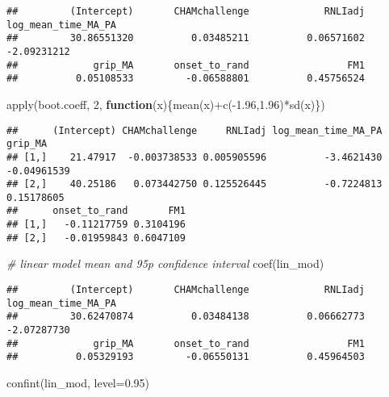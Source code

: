 \documentclass[
]{article}
\newenvironment{Shaded}{\begin{snugshade}}{\end{snugshade}}
\newcommand{\AttributeTok}[1]{\textcolor[rgb]{0.77,0.63,0.00}{#1}}
\newcommand{\CommentTok}[1]{\textcolor[rgb]{0.56,0.35,0.01}{\textit{#1}}}
\newcommand{\ControlFlowTok}[1]{\textcolor[rgb]{0.13,0.29,0.53}{\textbf{#1}}}
\newcommand{\DecValTok}[1]{\textcolor[rgb]{0.00,0.00,0.81}{#1}}
\newcommand{\FloatTok}[1]{\textcolor[rgb]{0.00,0.00,0.81}{#1}}
\newcommand{\FunctionTok}[1]{\textcolor[rgb]{0.00,0.00,0.00}{#1}}
\newcommand{\NormalTok}[1]{#1}
\newcommand{\SpecialCharTok}[1]{\textcolor[rgb]{0.00,0.00,0.00}{#1}}
\begin{document}
\begin{verbatim}
##         (Intercept)       CHAMchallenge             RNLIadj log_mean_time_MA_PA 
##         30.86551320          0.03485211          0.06571602         -2.09231212 
##             grip_MA       onset_to_rand                 FM1 
##          0.05108533         -0.06588801          0.45756524
\end{verbatim}

\begin{Shaded}
\begin{Highlighting}[]
\FunctionTok{apply}\NormalTok{(boot.coeff, }\DecValTok{2}\NormalTok{, }\ControlFlowTok{function}\NormalTok{(x)\{}\FunctionTok{mean}\NormalTok{(x)}\SpecialCharTok{+}\FunctionTok{c}\NormalTok{(}\SpecialCharTok{{-}}\FloatTok{1.96}\NormalTok{,}\FloatTok{1.96}\NormalTok{)}\SpecialCharTok{*}\FunctionTok{sd}\NormalTok{(x)\})}
\end{Highlighting}
\end{Shaded}

\begin{verbatim}
##      (Intercept) CHAMchallenge     RNLIadj log_mean_time_MA_PA     grip_MA
## [1,]    21.47917  -0.003738533 0.005905596          -3.4621430 -0.04961539
## [2,]    40.25186   0.073442750 0.125526445          -0.7224813  0.15178605
##      onset_to_rand       FM1
## [1,]   -0.11217759 0.3104196
## [2,]   -0.01959843 0.6047109
\end{verbatim}

\begin{Shaded}
\begin{Highlighting}[]
\CommentTok{\# linear model mean and 95p confidence interval}
\FunctionTok{coef}\NormalTok{(lin\_mod)}
\end{Highlighting}
\end{Shaded}

\begin{verbatim}
##         (Intercept)       CHAMchallenge             RNLIadj log_mean_time_MA_PA 
##         30.62470874          0.03484138          0.06662773         -2.07287730 
##             grip_MA       onset_to_rand                 FM1 
##          0.05329193         -0.06550131          0.45964503
\end{verbatim}

\begin{Shaded}
\begin{Highlighting}[]
\FunctionTok{confint}\NormalTok{(lin\_mod, }\AttributeTok{level=}\FloatTok{0.95}\NormalTok{)}
\end{Highlighting}
\end{Shaded}
\end{document}
